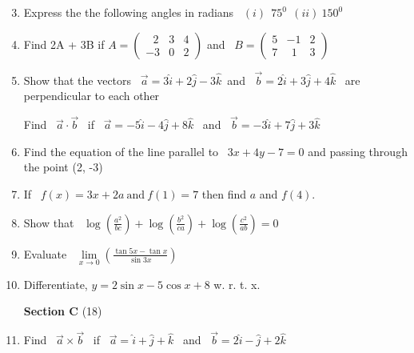 \documentclass[16pt,a4paper]{article}
\begin{document}
\begin{enumerate}
\setcounter{enumi}{2}


\item Express the the following angles in radians \ $(i)\ \ 75^0 \ \ (ii) \ 150^0 $
\item Find 2A + 3B if 
\( A = \left( 
\begin{array}{ccc} 
 \ \ \ 2&3&4 \\  -3&0&2
\end{array} 
\right) \) and  \ 
\( B = \left( 
\begin{array}{ccc} 
 5&-1&2 \\  7&\ \ 1&3
\end{array} 
\right) \)
 
\item Show that the vectors \ $\vec a = 3\hat i+ 2\hat j-3\hat k$\ and \ $\vec b = 2\hat i + 3\hat j + 4\hat k$ \ are perpendicular to each other

Find \ $\vec a \cdot \vec b$ \ if \ $\vec a = -5\hat i - 4\hat j + 8\hat k$ \ and \ $\vec b = -3\hat i + 7\hat j + 3\hat k$

\item Find the equation of the line parallel to \ $3x + 4y -7 = 0$ and passing through the point (2, -3)

\item If \ $f(x) = 3x + 2a \ \text{and}\ f(1) = 7$ then find $a$ and $f(4)$.

\item Show that \ $ \log \left(\frac {a^2}{bc} \right) +\log \left(\frac {b^2}{ca} \right) +     
\log \left(\frac {c^2}{ab} \right) = 0 $

\item Evaluate \ \(\lim\limits_{x \to 0}
 \left(\frac{\tan 5x - \tan x}{\sin 3x} \right) \)

\item Differentiate, $ y = 2\sin x - 5 \cos x + 8 $ w. r. t. x. 


\begin{center}

\hfill \textbf{Section C} \tabto{16.9cm}(18)

\end{center}

\item Find \ $\vec a \times \vec b $ \ if \ $\vec a = \hat i + \hat j + \hat k $  \ and \ $\vec b = 2\hat i - \hat j + 2\hat k $


\end{enumerate}
\end{document}
